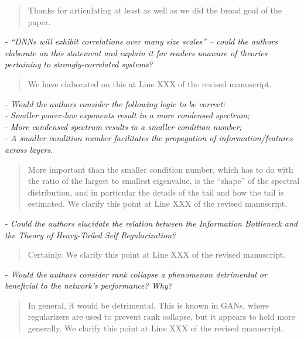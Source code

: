 \documentclass[11pt]{article}
\begin{document}
\begin{quote}
Thanks for articulating at least as well as we did the broad goal of the paper.
\end{quote}

\noindent
\emph{%
- ``DNNs will exhibit correlations over many size scales'' -- could the authors elaborate on this statement and explain it for readers unaware of theories pertaining to strongly-correlated systems?
}

\begin{quote}
We have elaborated on this at Line XXX of the revised manuscript.
\end{quote}

\noindent
\emph{%
- Would the authors consider the following logic to be correct: \\
- Smaller power-law exponents result in a more condensed spectrum; \\
- More condensed spectrum results in a smaller condition number; \\
- A smaller condition number facilitates the propagation of information/features across layers.
}

\begin{quote}
More important than the smaller condition number, which has to do with the ratio of the largest to smallest eigenvalue, is the ``shape'' of the spectral distribution, and in particular the details of the tail and how the tail is estimated.
We clarify this point at Line XXX of the revised manuscript.
\end{quote}

\noindent
\emph{%
- Could the authors elucidate the relation between the Information Bottleneck and the Theory of Heavy-Tailed Self Regularization?
}

\begin{quote}
Certainly.
We clarify this point at Line XXX of the revised manuscript.
\end{quote}

\noindent
\emph{%
- Would the authors consider rank collapse a phenomenon detrimental or beneficial to the network's performance? Why?
}

\begin{quote}
In general, it would be detrimental.
This is known in GANs, where regularizers are used to prevent rank collapse, but it appears to hold more generally.
We clarify this point at Line XXX of the revised manuscript.
\end{quote}
\end{document}
